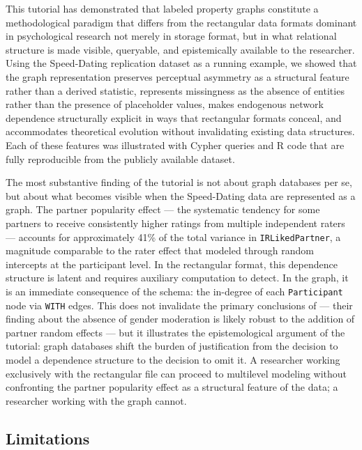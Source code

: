 \documentclass[sn-apa,pdflatex]{sn-jnl}
\theoremstyle{remark}
\theoremstyle{definition}
\begin{document}
This tutorial has demonstrated that labeled property graphs constitute a
methodological paradigm that differs from the rectangular data formats
dominant in psychological research not merely in storage format, but in
what relational structure is made visible, queryable, and epistemically
available to the researcher. Using the Speed-Dating replication dataset
\citep{Selterman2023} as a running example, we showed that the graph
representation preserves perceptual asymmetry as a structural feature
rather than a derived statistic, represents missingness as the absence
of entities rather than the presence of placeholder values, makes
endogenous network dependence structurally explicit in ways that
rectangular formats conceal, and accommodates theoretical evolution
without invalidating existing data structures. Each of these features
was illustrated with Cypher queries and R code that are fully
reproducible from the publicly available dataset.

The most substantive finding of the tutorial is not about graph
databases per se, but about what becomes visible when the Speed-Dating
data are represented as a graph. The partner popularity effect --- the
systematic tendency for some partners to receive consistently higher
ratings from multiple independent raters --- accounts for approximately
41\% of the total variance in \texttt{IRLikedPartner}, a magnitude
comparable to the rater effect that \citet{Selterman2015} modeled
through random intercepts at the participant level. In the rectangular
format, this dependence structure is latent and requires auxiliary
computation to detect. In the graph, it is an immediate consequence of
the schema: the in-degree of each \texttt{Participant} node via
\texttt{WITH} edges. This does not invalidate the primary conclusions of
\citet{Selterman2015} --- their finding about the absence of gender
moderation is likely robust to the addition of partner random effects
--- but it illustrates the epistemological argument of the tutorial:
graph databases shift the burden of justification from the decision to
model a dependence structure to the decision to omit it. A researcher
working exclusively with the rectangular file can proceed to multilevel
modeling without confronting the partner popularity effect as a
structural feature of the data; a researcher working with the graph
cannot.

\subsection{Limitations}\label{limitations}
\end{document}
